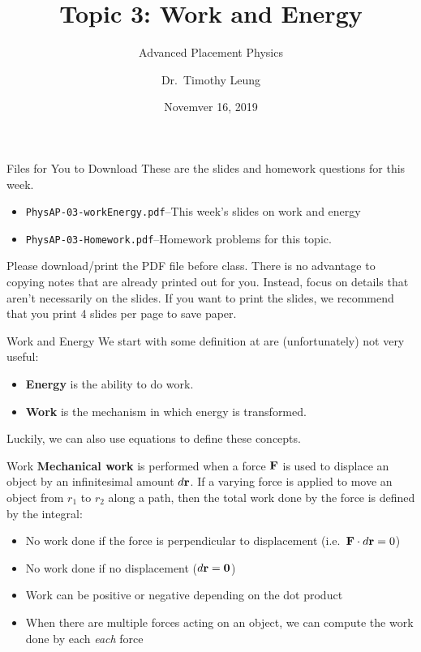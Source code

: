 \documentclass[12pt,compress,aspectratio=169]{beamer}
\title{Topic 3: Work and Energy}
\subtitle{Advanced Placement Physics}
\author[TML]{Dr.\ Timothy Leung}
\institute{Olympiads School, Toronto, ON, Canada}
\date{Novemver 16, 2019}
\newcommand{\mb}[1]{\ensuremath\mathbf{#1}}
\newcommand{\eq}[2]{\vspace{#1}{\Large\begin{displaymath}#2\end{displaymath}}}
\begin{document}
\begin{frame}
  \maketitle
\end{frame}

\begin{frame}{Files for You to Download}
  These are the slides and homework questions for this week.
  \begin{itemize}
  \item\texttt{PhysAP-03-workEnergy.pdf}--This week's slides on work and
    energy
  \item\texttt{PhysAP-03-Homework.pdf}--Homework problems for this topic.
  \end{itemize}
  Please download/print the PDF file before class. There is no advantage to
  copying notes that are already printed out for you. Instead, focus on details
  that aren't necessarily on the slides. If you want to print the slides, we
  recommend that you print 4 slides per page to save paper.
\end{frame}



\begin{frame}{Work and Energy}
  We start with some definition at are (unfortunately) not very useful:
  \begin{itemize}
    \item \textbf{Energy} is the ability to do work.
    \item \textbf{Work} is the mechanism in which energy is transformed.
  \end{itemize}
  Luckily, we can also use equations to define these concepts.
\end{frame}


\begin{frame}{Work}
  \textbf{Mechanical work} is performed when a force $\mb{F}$ is used to
  displace an object by an infinitesimal amount $d\mb{r}$. If a varying force
  is applied to move an object from $r_1$ to $r_2$ along a path, then the total
  work done by the force is defined by the integral:

  \eq{-.35in}{
    \boxed{W=\int_{r_1}^{r_2}\mb{F}(r)\cdot d\mb{r}}
  }

  \begin{itemize}
  \item No work done if the force is perpendicular to displacement
    (i.e.\ $\mb{F}\cdot d\mb{r}=0$)
  \item No work done if no displacement ($d\mb{r}=\mb{0}$)
  \item Work can be positive or negative depending on the dot product
  \item When there are multiple forces acting on an object, we can compute the
    work done by each \emph{each} force
  \end{itemize}
\end{frame}
\end{document}
